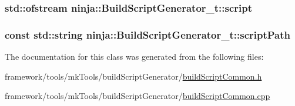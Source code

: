 \subsubsection[{\texorpdfstring{script}{script}}]{\setlength{\rightskip}{0pt plus 5cm}std\+::ofstream ninja\+::\+Build\+Script\+Generator\+\_\+t\+::script\hspace{0.3cm}{\ttfamily [protected]}}\hypertarget{classninja_1_1_build_script_generator__t_a85a5d0b1889526f54cae31b7df774c6d}{}\label{classninja_1_1_build_script_generator__t_a85a5d0b1889526f54cae31b7df774c6d}
\subsubsection[{\texorpdfstring{script\+Path}{scriptPath}}]{\setlength{\rightskip}{0pt plus 5cm}const std\+::string ninja\+::\+Build\+Script\+Generator\+\_\+t\+::script\+Path\hspace{0.3cm}{\ttfamily [protected]}}\hypertarget{classninja_1_1_build_script_generator__t_a0b5b6220fcc0c2314c1053f1045ab640}{}\label{classninja_1_1_build_script_generator__t_a0b5b6220fcc0c2314c1053f1045ab640}


The documentation for this class was generated from the following files\+:\begin{DoxyCompactItemize}
\item 
framework/tools/mk\+Tools/build\+Script\+Generator/\hyperlink{build_script_common_8h}{build\+Script\+Common.\+h}\item 
framework/tools/mk\+Tools/build\+Script\+Generator/\hyperlink{build_script_common_8cpp}{build\+Script\+Common.\+cpp}\end{DoxyCompactItemize}

